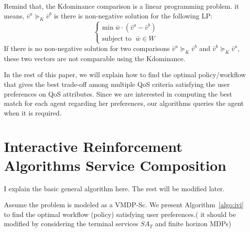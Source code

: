 \documentclass{sigchi}
\begin{document}
Remind that, the Kdominance comparison is a linear programming problem. it means, $\bar{v}^a  \succeq_K \bar{v}^b$ is there is non-negative solution for the following LP:
\begin{equation}
\left\{
\begin{array}{ll}
\text{min} \; \bar{w} \cdot (\bar{v}^a - \bar{v}^b) \\
\text{subject to } \; \bar{w} \in W
\end{array}
\right.
\end{equation}
If there is no non-negative solution for two comparisons $\bar{v}^a  \succeq_K \bar{v}^b$ and $\bar{v}^b  \succeq_K \bar{v}^a$, these two vectors are not comparable using the Kdominance. 

In the rest of this paper, we will explain how to find the optimal policy/workflow that gives the best trade-off among multiple QoS criteria satisfying the user preferences on QoS attributes. Since we are interested in computing the best match for each agent regarding her preferences, our algorithms queries the agent when it is required. %

\section{Interactive Reinforcement Algorithms Service Composition}

{\color{blue} I explain the basic general algorithm here. The rest will be modified later.}

Assume the problem is modeled as a VMDP-Sc. We present Algorithm~\ref{algo:ivi} to find the optimal workflow (policy) satisfying user preferences.({\color{red} it should be modified by considering the terminal services $SA_T$ and finite horizon MDPs}) 
\end{document}
